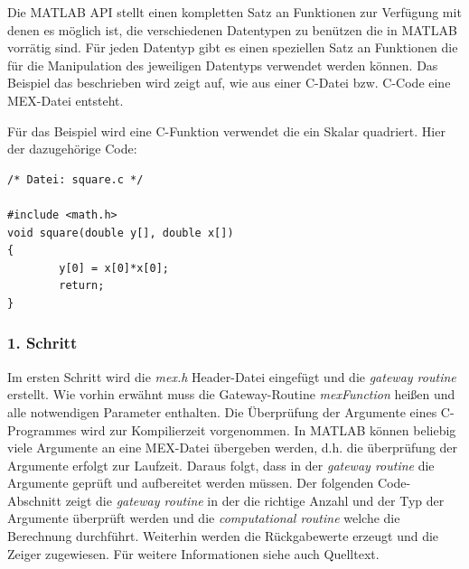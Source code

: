 \documentclass[10pt, bigheadings]{scrartcl}
\begin{document}
Die MATLAB API stellt einen kompletten Satz an Funktionen zur
Verfügung mit denen es möglich ist, die verschiedenen Datentypen
zu benützen die in MATLAB vorrätig sind. Für jeden Datentyp gibt
es einen speziellen Satz an Funktionen die für die Manipulation
des jeweiligen Datentyps verwendet werden können. Das Beispiel das
beschrieben wird zeigt auf, wie aus einer C-Datei bzw. C-Code
eine MEX-Datei entsteht.

Für das Beispiel wird eine C-Funktion verwendet die
ein Skalar quadriert. Hier der dazugehörige Code:
\begin{verbatim}
/* Datei: square.c */

#include <math.h>
void square(double y[], double x[])
{
        y[0] = x[0]*x[0];
        return;
}
\end{verbatim}

\subsubsection*{1. Schritt}
Im ersten Schritt wird die \textit{mex.h} Header-Datei eingefügt
und die \textit{gateway routine} erstellt. Wie vorhin erwähnt
muss die Gateway-Routine \textit{mexFunction} heißen und alle notwendigen
Parameter enthalten. Die Überprüfung der Argumente eines C-Programmes
wird zur Kompilierzeit vorgenommen. In MATLAB können beliebig viele
Argumente an eine MEX-Datei übergeben werden, d.h. die überprüfung der
Argumente erfolgt zur Laufzeit. Daraus folgt, dass in der
\textit{gateway routine} die Argumente geprüft und aufbereitet werden müssen.
Der folgenden Code-Abschnitt zeigt die \textit{gateway routine} in der
die richtige Anzahl und der Typ der Argumente überprüft werden und die
\textit{computational routine} welche die Berechnung durchführt. Weiterhin
werden die Rückgabewerte erzeugt und die Zeiger zugewiesen. Für weitere
Informationen siehe auch Quelltext.
\end{document}
